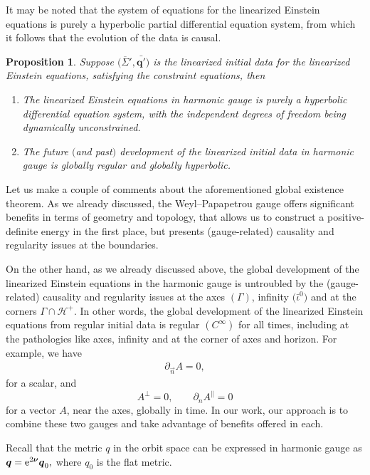 \documentclass[11pt]{article}
\numberwithin{equation}{section}
\def\ptl{\partial}%
\def\mbo#1{\boldsymbol{#1}}%
\def\olin#1{\overline{#1}{}}%
\numberwithin{equation}{section}
\newtheorem{Proposition}[Theorem]{Proposition}
\begin{document}
It may be noted that the system of equations for the linearized Einstein equations is purely a hyperbolic partial differential equation system, from which it follows that the evolution of the data is causal.
\begin{Proposition}
Suppose $\bigl(\olin{\Sigma}', \bar{\mbo{q}'}\bigr)$ is the linearized initial data for the linearized Einstein equations, satisfying the constraint equations, then
\begin{enumerate}\itemsep=0pt
\item[$(1)$] The linearized Einstein equations in harmonic gauge is purely a hyperbolic differential equation system, with the independent degrees of freedom being dynamically unconstrained.
\item[$(2)$] The future $($and past$)$ development of the linearized initial data in harmonic gauge is globally regular and globally hyperbolic.
\end{enumerate}
\end{Proposition}
Let us make a couple of comments about the aforementioned global existence theorem. As we already discussed, the Weyl--Papapetrou gauge offers significant benefits in terms of geometry and topology, that allows us to construct a positive-definite energy in the first place, but presents (gauge-related) causality and regularity issues at the boundaries.

On the other hand, as we already discussed above, the global development of the linearized Einstein equations in the harmonic gauge is untroubled by the (gauge-related) causality and regularity issues at the axes $(\Gamma)$, infinity $\bigl(\bar{\iota}^0\bigr)$ and at the corners $\Gamma \cap \mathcal{H}^+$. In other words, the global development of the linearized Einstein equations from regular initial data is regular $(C^\infty)$ for all times, including at the pathologies like axes, infinity and at the corner of axes and horizon. For example, we have
\begin{align*}
\ptl_{\vec{n}} A =0,
\end{align*}
for a scalar, and
\[
A^{\perp} =0, \qquad \ptl_n A^{\parallel} =0
\]
for a vector $A$, near the axes, globally in time. In our work, our approach is to combine these two gauges and take advantage of benefits offered in each.

Recall that the metric $q$ in the orbit space can be expressed in harmonic gauge as $\mbo{q} = {\rm e}^{2 \mbo{\nu}} \mbo{q}_0, $ where $q_0$ is the flat metric.
\end{document}
